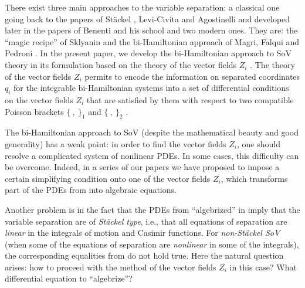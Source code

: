 \documentclass[10pt,a4paper]{amsart}
\numberwithin{equation}{section}
\begin{document}
There exist three main approaches to the variable separation: a classical one going back to the papers of St\"ackel \cite{Sta1,Sta2}, Levi-Civita \cite{Levi} and Agostinelli \cite{Agost} and developed later in the papers of Benenti and his school \cite{Benenti, Chanu1,Chanu2} and two modern ones. They are: the
 ``magic recipe'' of Sklyanin \cite{SklSep} and the bi-Hamiltonian approach of Magri, Falqui and Pedroni \cite{MFP,FP,FP2}.
 In the present paper, we develop the bi-Hamiltonian approach to SoV theory in its formulation based on the theory of the vector fields $Z_i$ \cite{MFP,FP,FP2}.
The theory of the vector fields $Z_i$ permits to encode the information on separated coordinates $q_i$ for the integrable bi-Hamiltonian systems into a set of differential conditions on the vector fields $Z_i$ that are satisfied by them with respect to two compatible Poisson brackets $\{\ ,\ \}_1$ and $\{\ ,\ \}_2$ \cite{MFP,FP,FP2}.

The bi-Hamiltonian approach to SoV (despite the mathematical beauty and good generality) has a weak point: in order to find the vector fields $Z_i$, one should resolve a complicated system of nonlinear PDEs. In some cases, this difficulty can be overcome. Indeed, in a series of our papers \cite{MagSkr, SkrJGP2019, SkrSto, SkrBD} we have proposed to impose a certain simplifying condition onto one of the vector fields $Z_i$, which transforms part of the PDEs from \cite{MFP,FP,FP2} into algebraic equations.

Another problem is in the fact that
the PDEs from \cite{MFP,FP,FP2} ``algebrized'' in \cite{MagSkr, SkrJGP2019, SkrSto, SkrBD} imply that the variable separation are of {\it St\"ackel type}, i.e., that all equations of separation are {\it linear} in the integrals of motion and Casimir functions. For {\it non-St\"ackel SoV} (when some of the equations of separation are {\it nonlinear} in some of the integrals), the corresponding equalities from \cite{MFP,FP,FP2} do not hold true.
Here the natural question arises: how to proceed with the method of the vector fields $Z_i$ in this case? What differential equation to ``algebrize''?
\end{document}
